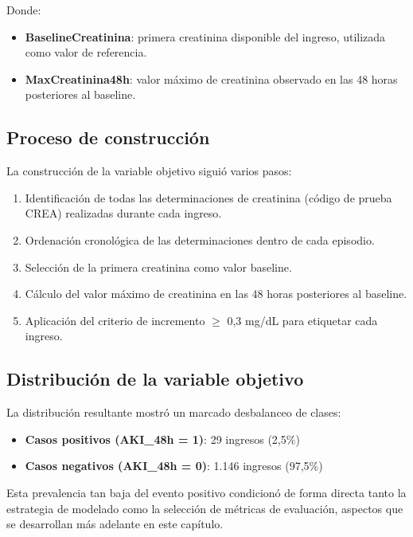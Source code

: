 \documentclass[12pt, a4paper, oneside]{report}
\begin{document}
Donde:
\begin{itemize}
    \item \textbf{BaselineCreatinina}: primera creatinina disponible del ingreso, utilizada como valor de referencia.
    \item \textbf{MaxCreatinina48h}: valor máximo de creatinina observado en las 48 horas posteriores al baseline.
\end{itemize}

\subsection{Proceso de construcción}

La construcción de la variable objetivo siguió varios pasos:

\begin{enumerate}
    \item Identificación de todas las determinaciones de creatinina (código de prueba CREA) realizadas durante cada ingreso.
    \item Ordenación cronológica de las determinaciones dentro de cada episodio.
    \item Selección de la primera creatinina como valor baseline.
    \item Cálculo del valor máximo de creatinina en las 48 horas posteriores al baseline.
    \item Aplicación del criterio de incremento $\geq$ 0,3 mg/dL para etiquetar cada ingreso.
\end{enumerate}

\subsection{Distribución de la variable objetivo}

La distribución resultante mostró un marcado desbalanceo de clases:

\begin{itemize}
    \item \textbf{Casos positivos (AKI\_48h = 1)}: 29 ingresos (2,5\%)
    \item \textbf{Casos negativos (AKI\_48h = 0)}: 1.146 ingresos (97,5\%)
\end{itemize}

Esta prevalencia tan baja del evento positivo condicionó de forma directa tanto la estrategia de modelado como la selección de métricas de evaluación, aspectos que se desarrollan más adelante en este capítulo.
\end{document}
